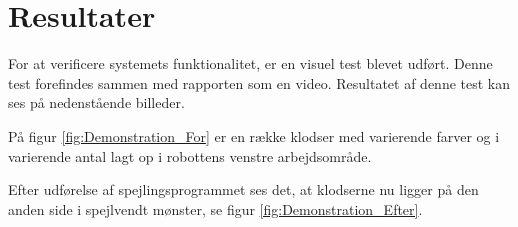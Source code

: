 \chapter{Resultater}\label{chap:Resultater}
For at verificere systemets funktionalitet, er en visuel test blevet udført.
Denne test forefindes sammen med rapporten som en video.
Resultatet af denne test kan ses på nedenstående billeder. 

På figur \ref{fig:Demonstration_For} er en række klodser med varierende farver og i varierende antal lagt op i robottens venstre arbejdsområde.

Efter udførelse af spejlingsprogrammet ses det, at klodserne nu ligger på den anden side i spejlvendt mønster, se figur \ref{fig:Demonstration_Efter}.

